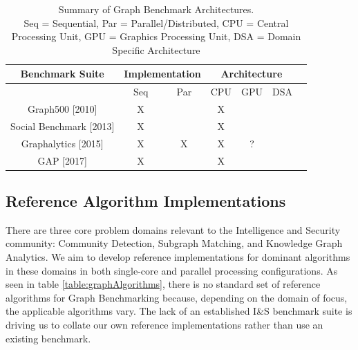 \documentclass[letterpaper, 10pt]{article}
\begin{document}
\begin{multicols}{2}
{        \scriptsize
        \begin{table}[t]
        \centering
          \begin{tabular}{ |c|c|c|c|c|c|c|}
            \hline
            {Benchmark Suite} & \multicolumn{2}{|c|}{Implementation} & \multicolumn{3}{|c|}{Architecture}\\
            \hline
                                                      & Seq & Par & CPU & GPU & DSA \\
            \hline
             Graph500 [2010]\cite{Murphy2010}         & X   &     & X   &     &     \\
             Social Benchmark [2013]\cite{Angles2013} & X   &     & X   &     &     \\
             Graphalytics [2015]\cite{Capota2015}     & X   &  X  & X   &  ?  &     \\
             GAP [2017]\cite{Beamer2017}              & X   &     & X   &     &     \\
            \hline
          \end{tabular}
          \caption{Summary of Graph Benchmark Architectures.\\ Seq = Sequential, Par = Parallel/Distributed, CPU = Central Processing Unit, GPU = Graphics Processing Unit, DSA = Domain Specific Architecture}
          \label{table:graphArchitectures}
        \end{table}
        \normalsize

    \subsection{Reference Algorithm Implementations}\label{section:referenceAlgorithms}
        \par{There are three core problem domains relevant to the Intelligence and Security community: Community Detection, Subgraph Matching, and Knowledge Graph Analytics. 
        We aim to develop reference implementations for dominant algorithms in these domains in both single-core and parallel processing configurations.
        As seen in table \ref{table:graphAlgorithms}, there is no standard set of reference algorithms for Graph Benchmarking because, depending on the domain of focus, the applicable algorithms vary. The lack of an established I\&S benchmark suite is driving us to collate our own reference implementations rather than use an existing benchmark. 
        
}}
\end{multicols}
\end{document}
